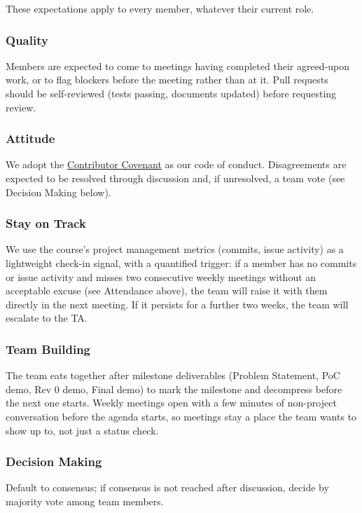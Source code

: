 \documentclass{article}
\begin{document}
These expectations apply to every member, whatever their current role.

\subsubsection*{Quality}

Members are expected to come to meetings having completed their agreed-upon
work, or to flag blockers before the meeting rather than at it. Pull
requests should be self-reviewed (tests passing, documents updated) before
requesting review.

\subsubsection*{Attitude}

We adopt the
\href{https://www.contributor-covenant.org/}{Contributor Covenant} as our
code of conduct. Disagreements are expected to be resolved through
discussion and, if unresolved, a team vote (see Decision Making below).

\subsubsection*{Stay on Track}

We use the course's project management metrics (commits, issue activity) as
a lightweight check-in signal, with a quantified trigger: if a member has no
commits or issue activity and misses two consecutive weekly meetings
without an acceptable excuse (see Attendance above), the team will raise it
with them directly in the next meeting. If it persists for a further two
weeks, the team will escalate to the TA.

\subsubsection*{Team Building}

The team eats together after milestone deliverables (Problem Statement,
PoC demo, Rev 0 demo, Final demo) to mark the milestone and decompress
before the next one starts. Weekly meetings open with a few minutes of
non-project conversation before the agenda starts, so meetings stay a
place the team wants to show up to, not just a status check.

\subsubsection*{Decision Making}

Default to consensus; if consensus is not reached after discussion, decide
by majority vote among team members.
\end{document}
